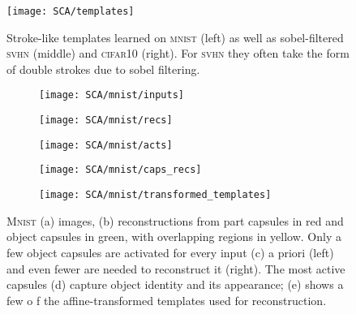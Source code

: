 \begin{figure}
	\centering
		\texttt{[image: SCA/templates]}
		\caption{Stroke-like templates learned on \textsc{mnist} (left) as well as sobel-filtered \textsc{svhn} (middle) and \textsc{cifar10} (right).
			For \textsc{svhn} they often take the form of double strokes due to sobel filtering.
		}
		\label{fig:learned_templates}
\end{figure}
\begin{figure}
	\centering
	\begin{subfigure}[c]{.06\linewidth}
		\texttt{[image: SCA/mnist/inputs]}
		\caption{}
	\end{subfigure}
	\begin{subfigure}[c]{.06\linewidth}
		\texttt{[image: SCA/mnist/recs]}
		\caption{}
	\end{subfigure}
	\begin{subfigure}[c]{.03967\linewidth}
		\texttt{[image: SCA/mnist/acts]}
		\caption{}
	\end{subfigure}
	\begin{subfigure}[c]{.12\linewidth}
		\texttt{[image: SCA/mnist/caps\_recs]}
		\caption{}
	\end{subfigure}
	\begin{subfigure}[c]{.30\linewidth}
		\texttt{[image: SCA/mnist/transformed\_templates]}
		\caption{}
	\end{subfigure}
		\caption{
			\textsc{Mnist} (a) images, (b) reconstructions from part capsules in red and object capsules in green, with overlapping regions in yellow.
			Only a few object capsules are activated for every input (c) a priori (left) and even fewer are needed to reconstruct it (right).
			The most active capsules (d) capture object identity and its appearance;
			(e) shows a few o  f the affine-transformed templates used for reconstruction.
		}
		\label{fig:mnist_rec}
\end{figure}

